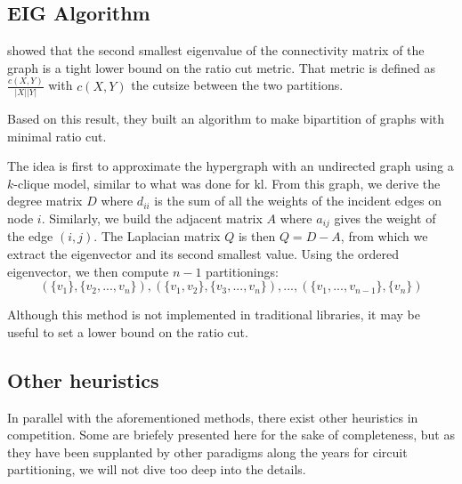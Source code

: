 \documentclass[11pt,a4paper]{report} %
\theoremstyle{customdef}
\begin{document}
\subsection{EIG Algorithm}
\citet{Hagen1992} showed that the second smallest eigenvalue of the connectivity matrix of the graph is a tight lower bound on the ratio cut metric.
That metric is defined as $\frac{c(X,Y)}{|X||Y|}$ with $c(X, Y)$ the cutsize between the two partitions.

Based on this result, they built an algorithm to make bipartition of graphs with minimal ratio cut.

The idea is first to approximate the hypergraph with an undirected graph using a $k$-clique model, similar to what was done for \gls{kl}.
From this graph, we derive the degree matrix $D$ where  $d_{ii}$ is the sum of all the weights of the incident edges on node $i$.
Similarly, we build the adjacent matrix $A$ where $a_{ij}$ gives the weight of the edge $(i, j)$.
The Laplacian matrix $Q$ is then $Q = D - A$, from which we extract the eigenvector and its second smallest value.
Using the ordered eigenvector, we then compute $n-1$ partitionings: \[(\{v_1\}, \{v_2, ..., v_n\}), (\{v_1, v_2\}, \{v_3, ..., v_n\}), ..., (\{v_1, ..., v_{n-1}\}, \{v_n\})\]

Although this method is not implemented in traditional libraries, it may be useful to set a lower bound on the ratio cut.










\subsection{Other heuristics}
In parallel with the aforementioned methods, there exist other heuristics in competition.
Some are briefely presented here for the sake of completeness, but as they have been supplanted by other paradigms along the years for circuit partitioning, we will not dive too deep into the details.
\end{document}
